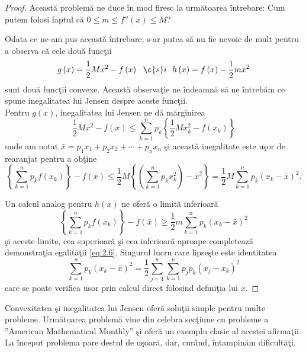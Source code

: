 \documentclass[a4paper,12pt,oneside]{report}
\begin{document}
\begin{proof}
Aceast\u{a} problem\u{a} ne duce \^{i}n mod firesc la urm\u{a}toarea \^{i}ntrebare: Cum putem folosi faptul c\u{a} \(0\leq m\leq {f}''\left ( x \right )\leq M \)?

Odata ce ne-am pus aceast\u{a} \^{i}ntrebare, s-ar putea s\u{a} nu fie nevoie de mult pentru a observa c\u{a} cele dou\u{a} func\c{t}ii
\begin{displaymath}
  g\left ( x \right ) = \frac{1}{2}Mx^{2} - f\left ( x \right )~~ \c{s}i~~
h\left ( x \right ) = f\left ( x \right ) - \frac{1}{2}mx^{2}
\end{displaymath}
sunt dou\u{a} func\c{t}ii convexe.
Aceast\u{a} observa\c{t}ie ne \^{i}ndeamn\u{a} s\u{a} ne \^{i}ntreb\u{a}m ce spune inegalitatea lui Jensen despre aceste func\c{t}ii.\\
Pentru \(g\left ( x \right )\), inegalitatea lui Jensen ne d\u{a} m\u{a}rginirea
\begin{displaymath}
  \frac{1}{2}M\bar{x}^{2} - f\left ( \bar{x} \right )\leq \sum_{k = 1}^{n}p_{k}\left \{ \frac{1}{2}Mx_{k}^{2} - f\left ( x_{k} \right )\right \}
\end{displaymath}
unde am notat \(\bar{x} = p_{1}x_{1}+ p_{2}x_{2}+ \cdots + p_{n}x_{n}\) \c{s}i aceast\u{a} inegalitate este u\c{s}or de rearanjat  pentru a ob\c{t}ine
\begin{displaymath}
  \left \{ \sum_{k = 1}^{n} p_{k}f\left ( x_{k} \right )\right \} - f\left (\bar{x}  \right )\leq \frac{1}{2}M\left \{ \left ( \sum_{k=1}^{n} p_{k}x_{k}^{2}\right ) - \bar{x}^{2} \right \} = \frac{1}{2}M\sum_{k = 1}^{n}p_{k}\left ( x_{k} - \bar{x} \right )^{2}.
\end{displaymath}

Un calcul analog pentru  \(h\left ( x \right )\) ne ofer\u{a} o limit\u{a} inferioar\u{a}
\begin{displaymath}
  \left \{ \sum_{k = 1}^{n} p_{k}f\left ( x_{k} \right )\right \} - f\left (\bar{x}  \right )\geq \frac{1}{2}m\sum_{k = 1}^{n}p_{k}\left ( x_{k} - \bar{x} \right )^{2}
\end{displaymath}
\c{s}i aceste limite, cea superioar\u{a} \c{s}i cea inferioar\u{a} aproape completeaz\u{a} demonstra\c{t}ia egalit\u{a}\c{t}ii  \ref{eq:2.6}. Singurul lucru care lipse\c{s}te este identitatea
\begin{displaymath}
  \sum_{k = 1}^{n}p_{k}\left ( x_{k} - \bar{x} \right )^{2} = \frac{1}{2}\sum_{j = 1}^{n}\sum_{k = 1}^{n} p _{j}p_{k}\left ( x_{j} - x_{k} \right )^{2}
\end{displaymath}
care se poate verifica usor prin calcul direct folosind defini\c{t}ia lui \(\bar{x}\).
\end{proof}
Convexitatea \c{s}i inegalitatea lui Jensen ofer\u{a} solu\c{t}ii simple pentru multe probleme.
  Urm\u{a}toarea problem\u{a} vine din celebra sec\c{t}iune cu probleme a ”American Mathematical Monthly” \c{s}i ofer\u{a} un exemplu clasic al acestei afirma\c{t}ii.
  La \^{i}nceput problema pare destul de u\c{s}oar\u{a}, dar, cur\^{a}nd, \^{i}ntampin\u{a}m dificult\u{a}\c{t}i.
\end{document}
